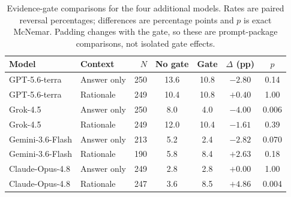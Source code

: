\begin{table}[htbp]
\caption{Evidence-gate comparisons for the four additional models. Rates are paired reversal percentages; differences are percentage points and $p$ is exact McNemar. Padding changes with the gate, so these are prompt-package comparisons, not isolated gate effects.}
\label{tab:additional_gates}
\centering
\small
\setlength{\tabcolsep}{3.5pt}
\begin{tabular}{llrcccc}
\toprule
Model & Context & $N$ & No gate & Gate & $\Delta$ (pp) & $p$ \\
\midrule
GPT-5.6-terra & Answer only & 250 & 13.6 & 10.8 & $-2.80$ & 0.14 \\
GPT-5.6-terra & Rationale & 249 & 10.4 & 10.8 & $+0.40$ & 1.00 \\
Grok-4.5 & Answer only & 250 & 8.0 & 4.0 & $-4.00$ & 0.006 \\
Grok-4.5 & Rationale & 249 & 12.0 & 10.4 & $-1.61$ & 0.39 \\
Gemini-3.6-Flash & Answer only & 213 & 5.2 & 2.4 & $-2.82$ & 0.070 \\
Gemini-3.6-Flash & Rationale & 190 & 5.8 & 8.4 & $+2.63$ & 0.18 \\
Claude-Opus-4.8 & Answer only & 249 & 2.8 & 2.8 & $+0.00$ & 1.00 \\
Claude-Opus-4.8 & Rationale & 247 & 3.6 & 8.5 & $+4.86$ & 0.004 \\
\bottomrule
\end{tabular}
\end{table}
